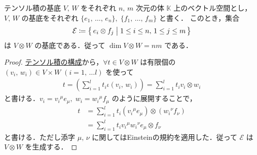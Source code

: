 \documentclass[geometry_main]{subfiles}
\begin{document}
\begin{myprop}[label=prop:basis-tensor]{テンソル積の基底}
	$V,\, W$  をそれぞれ $n,\, m$ 次元の体 $\mathbb{K}$ 上のベクトル空間とし，$V,\, W$ の基底をそれぞれ $\{e_1,\, \dots,\, e_n\},\; \{f_1,\, \dots,\, f_m\}$ と書く．
	このとき，集合
	\begin{align}
		\mathcal{E} \coloneqq \bigl\{\, e_i \otimes f_j \bigm| 1 \le i \le n,\, 1 \le j \le m \,\bigr\} 
	\end{align}
	は $V \otimes W$ の基底である．従って $\dim V \otimes W = nm$ である．
\end{myprop}

\begin{proof}
	\hyperref[prop:tensor-vec]{テンソル積の構成}から，$\forall t \in V \otimes W$ は有限個の $(v_i,\, w_i) \in V \times W\; (i=1,\, \dots l)$ を使って
	\begin{align}
		t = \left(\sum_{i=1}^l t_{i} \iota(v_i,\, w_i)\right) = \sum_{i=1}^l t_i v_i \otimes w_i
	\end{align}
	と書ける．$v_i = v_i{}^\mu e_\mu,\; w_i = w_i{}^{\mu} f_\mu$ のように展開することで，
	\begin{align}
		t &= \sum_{i=1}^l t_i (v_i{}^\mu e_\mu) \otimes (w_i{}^\nu f_\nu) \\
		&= \sum_{i=1}^l t_i v_i{}^\mu w_i{}^\nu e_{\mu} \otimes f_\nu
	\end{align}
	と書ける．ただし添字 $\mu,\, \nu$ に関してはEinsteinの規約を適用した．従って $\mathcal{E}$ は $V \otimes W$ を生成する．


\end{proof}
\end{document}
